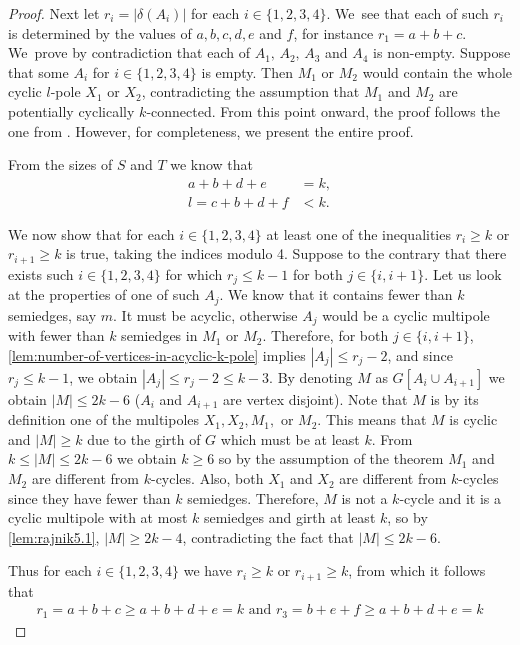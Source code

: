 \documentclass[12pt, twoside]{book}
\begin{document}
\begin{proof}
	Next let $r_i=|\delta(A_i)|$ for each $i\in\{1,2,3,4\}$. We~see that each of such $r_i$ is determined by the values of $a,b,c,d,e$ and $f$, for instance $r_1=a+b+c$. We~prove by contradiction that each of $A_1, \,A_2,\,A_3$ and $A_4$ is non-empty. Suppose that some $A_i$ for $i\in\{1,2,3,4\}$ is empty. Then $M_1$ or $M_2$ would contain the whole cyclic $l$-pole $X_1$ or $X_2$, contradicting the assumption that $M_1$ and $M_2$ are potentially cyclically $k$-connected. From this point onward, the proof follows the one from \mbox{\cite[Theorem 5.2]{Rajnik_phd}}. However, for completeness, we present the entire proof.
	
	From the sizes of $S$ and $T$ we know that
	\begin{align*}
		a+b+d+e &= k,\\
		l=c+b+d+f &< k.
	\end{align*}
	
	We now show that for each $i\in\{1,2,3,4\}$ at least one of the inequalities $r_i\geq k$ or $r_{i+1}\geq k$ is true, taking the indices modulo 4. Suppose to the contrary that there exists such $i\in\{1,2,3,4\}$ for which $r_j\leq k-1$ for both $j\in\{i, i+1\}$. Let us look at the properties of one of such $A_j$. We know that it contains fewer than $k$ semiedges, say $m$. It must be acyclic, otherwise $A_j$ would be a cyclic multipole with fewer than $k$ semiedges in $M_1$ or $M_2$. Therefore, for both $j\in\{i,i+1\}$, \cref{lem:number-of-vertices-in-acyclic-k-pole} implies $|A_j|\leq r_j-2$, and since $r_j\leq k-1$, we obtain $|A_j|\leq r_j-2\leq k-3$. By denoting $M$ as $G[A_i\cup A_{i+1}]$ we obtain $|M|\leq 2k-6$ ($A_i$ and $A_{i+1}$ are vertex disjoint). Note that $M$ is by its definition one of the multipoles $X_1, X_2, M_1,$ or $M_2$. This means that $M$ is cyclic and $|M|\geq k$ due to the girth of $G$ which must be at least $k$. From $k\leq |M|\leq 2k-6$ we obtain $k\geq 6$ so by the assumption of the theorem $M_1$ and $M_2$ are different from $k$-cycles. Also, both $X_1$ and $X_2$ are different from $k$-cycles since they have fewer than $k$ semiedges. Therefore, $M$ is not a $k$-cycle and it is a cyclic multipole with at most $k$ semiedges and girth at least $k$, so by \cref{lem:rajnik5.1}, $|M| \geq 2k - 4$, contradicting the fact that $|M|\leq 2k-6$.
	
	Thus for each $i\in\{1,2,3,4\}$ we have $r_i\geq k$ or $r_{i+1}\geq k$, from which it follows that
	\begin{align*}
	r_1 =a+b+c\geq a+b+d+e=k \text{ and } r_3 =b+e+f \geq a+b+d+e=k
	\end{align*}
	

\end{proof}
\end{document}
